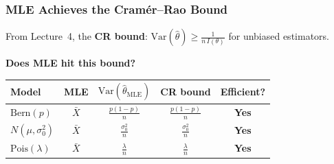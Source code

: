 \documentclass[aspectratio=169]{beamer}
\begin{document}
\begin{frame}
\frametitle{MLE Achieves the Cram\'er--Rao Bound}

\small
From Lecture~4, the \textbf{CR bound}: $\text{Var}(\hat\theta) \geq \frac{1}{n\,I(\theta)}$ for unbiased estimators.

\vspace{0.2cm}
\textbf{Does MLE hit this bound?}

\vspace{0.2cm}
\begin{center}
\renewcommand{\arraystretch}{1.6}
\begin{tabular}{lcccc}
  \textbf{Model} & \textbf{MLE} & $\text{Var}(\hat\theta_{\text{MLE}})$ & \textbf{CR bound} & \textbf{Efficient?} \\
  \hline
  $\text{Bern}(p)$ & $\bar{X}$ & $\frac{p(1-p)}{n}$ & $\frac{p(1-p)}{n}$ & \textcolor{paramgreen}{\textbf{Yes}} \\[3pt]
  $N(\mu, \sigma_0^2)$ & $\bar{X}$ & $\frac{\sigma_0^2}{n}$ & $\frac{\sigma_0^2}{n}$ & \textcolor{paramgreen}{\textbf{Yes}} \\[3pt]
  $\text{Pois}(\lambda)$ & $\bar{X}$ & $\frac{\lambda}{n}$ & $\frac{\lambda}{n}$ & \textcolor{paramgreen}{\textbf{Yes}} \\
  \hline
\end{tabular}
\end{center}

\vspace{0.2cm}
\begin{center}
\end{center}
\end{frame}
\end{document}
